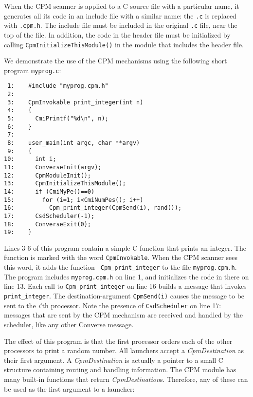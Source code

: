 When the CPM scanner is applied to a C source file with a particular
name, it generates all its code in an include file with a similar
name: the {\tt .c} is replaced with {\tt .cpm.h}.  The include file
must be included in the original {\tt .c} file, near the top of the
file.  In addition, the code in the header file must be initialized by
calling {\tt CpmInitializeThisModule()} in the module that includes
the header file.

We demonstrate the use of the CPM mechanisms using the following
short program {\tt myprog.c}:

\begin{verbatim}
 1:    #include "myprog.cpm.h"
 2:   
 3:    CpmInvokable print_integer(int n)
 4:    {
 5:      CmiPrintf("%d\n", n);
 6:    }
 7:    
 8:    user_main(int argc, char **argv)
 9:    {
10:      int i;
11:      ConverseInit(argv);
12:      CpmModuleInit();
13:      CpmInitializeThisModule();
14:      if (CmiMyPe()==0)
15:        for (i=1; i<CmiNumPes(); i++)
16:          Cpm_print_integer(CpmSend(i), rand());
17:      CsdScheduler(-1);
18:      ConverseExit(0);
19:    }
\end{verbatim}

Lines 3-6 of this program contain a simple C function that prints an
integer.  The function is marked with the word {\tt CpmInvokable}.
When the CPM scanner sees this word, it adds the function {\tt
Cpm\_print\_integer} to the file {\tt myprog.cpm.h}.  The program
includes {\tt myprog.cpm.h} on line 1, and initializes the code in
there on line 13.  Each call to {\tt Cpm\_print\_integer} on line 16
builds a message that invokes {\tt print\_integer}.  The
destination-argument {\tt CpmSend(i)} causes the message to be sent to
the {\it i}'th processor.  Note the presence of {\tt CsdScheduler} on
line 17: messages that are sent by the CPM mechanism are received and
handled by the scheduler, like any other Converse message.

The effect of this program is that the first processor orders each of
the other processors to print a random number.
\pagebreak
All launchers accept a {\it CpmDestination} as their first argument.  A
{\it CpmDestination} is actually a pointer to a small C structure
containing routing and handling information.  The CPM module has many
built-in functions that return {\it CpmDestination}s.  Therefore, any
of these can be used as the first argument to a launcher:

